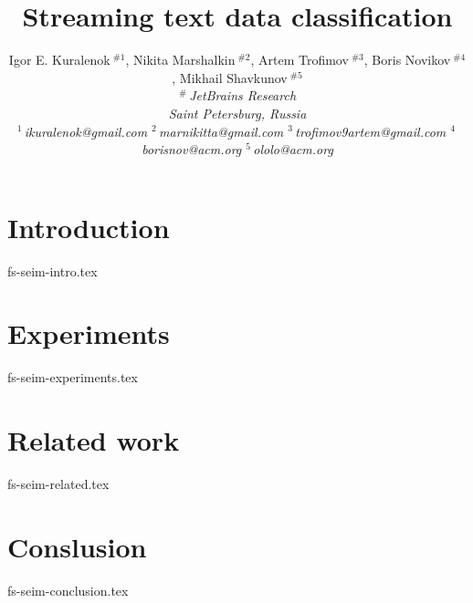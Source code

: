 \documentclass[10pt,conference,letterpaper]{IEEEtran}
\title{Streaming text data classification}
\author{%
{Igor E. Kuralenok{\small $~^{\#1}$}, 
    Nikita Marshalkin{\small $~^{\#2}$},
    Artem Trofimov{\small $~^{\#3}$}, 
    Boris Novikov{\small $~^{\#4}$},
    Mikhail Shavkunov{\small $~^{\#5}$}}%
\vspace{1.6mm}\\
\fontsize{10}{10}\selectfont\itshape
$^{\#}$\,JetBrains Research\\
Saint Petersburg, Russia\\
\fontsize{9}{9}\selectfont\ttfamily\upshape
%
$^1$\,ikuralenok@gmail.com   %
$^2$\,marnikitta@gmail.com    %
$^3$\,trofimov9artem@gmail.com   %
$^4$\,borisnov@acm.org %
$^5$\,ololo@acm.org
}
\begin{document}
\maketitle
%
\begin{abstract} 

\end{abstract}

%
\section {Introduction}
 {fs-seim-intro.tex}

\section{Experiments}
 {fs-seim-experiments.tex}

\section{Related work}
 {fs-seim-related.tex}

\section{Conslusion}
 {fs-seim-conclusion.tex}



\end{document}
